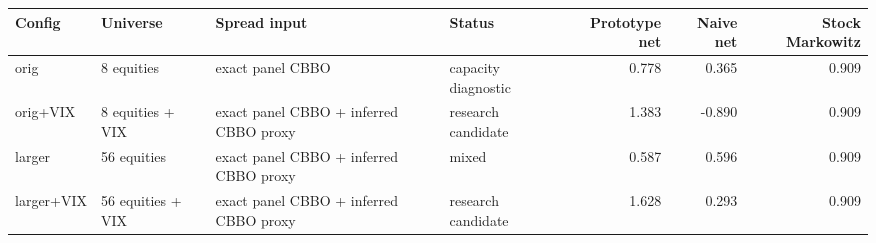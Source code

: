 \begin{tabular}{llllrrr}
\toprule
Config & Universe & Spread input & Status & Prototype net & Naive net & Stock Markowitz \\
\midrule
orig & 8 equities & exact panel CBBO & capacity diagnostic & 0.778 & 0.365 & 0.909 \\
orig+VIX & 8 equities + VIX & exact panel CBBO + inferred CBBO proxy & research candidate & 1.383 & -0.890 & 0.909 \\
larger & 56 equities & exact panel CBBO + inferred CBBO proxy & mixed & 0.587 & 0.596 & 0.909 \\
larger+VIX & 56 equities + VIX & exact panel CBBO + inferred CBBO proxy & research candidate & 1.628 & 0.293 & 0.909 \\
\bottomrule
\end{tabular}
